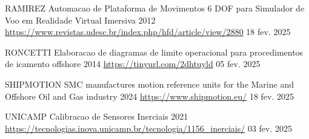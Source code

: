     {RAMIREZ}
    {Automacao de Plataforma de Movimentos 6 DOF para Simulador de Voo em Realidade Virtual Imersiva}
    {2012}
    {\url{https://www.revistas.udesc.br/index.php/hfd/article/view/2880}}
    {18 fev. 2025}

    {RONCETTI}
    {Elaboracao de diagramas de limite operacional para procedimentos de icamento offshore}
    {2014}
    {\url{https://tinyurl.com/2dhtuyld}}
    {05 fev. 2025}

    {SHIPMOTION}
    {SMC manufactures motion reference units for the Marine and Offshore Oil and Gas industry}
    {2024}
    {\url{https://www.shipmotion.eu/}}
    {18 fev. 2025}

    {UNICAMP}
    {Calibracao de Sensores Inerciais}
    {2021}
    {\url{https://tecnologias.inova.unicamp.br/tecnologia/1156_inerciais/}}
    {03 fev. 2025}

\phantom{a}